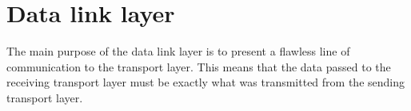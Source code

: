 \chapter{Data link layer}
The main purpose of the data link layer is to present a flawless line of
communication to the transport layer. This means that the data passed to the
receiving transport layer must be exactly what was transmitted from the sending
transport layer. 
